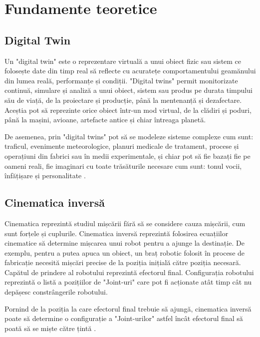 
\clearpage




\section{Fundamente teoretice}
\subsection{Digital Twin}
Un "digital twin" este o reprezentare virtuală a unui obiect fizic sau sistem ce folosește date din timp real să reflecte cu acuratețe comportamentului geamănului din lumea reală, performanțe și condiții.
"Digital twins" permit monitorizate continuă, simulare și analiză a unui obiect, sistem sau produs pe durata timpului său de viață, de la proiectare și producție, până la mentenanță și dezafectare.
Aceștia pot  să reprezinte orice obiect într-un mod virtual, de la clădiri și poduri, până la mașini, avioane, artefacte antice și chiar întreaga planetă\cite{DigTwinIBM}. 

De asemenea, prin "digital twins"  pot să se modeleze sisteme complexe cum sunt: traficul, evenimente meteorologice, planuri medicale de tratament, procese și operațiuni din fabrici sau în medii experimentale, și chiar pot să fie bazați fie pe oameni reali, fie imaginari cu toate trăsăturile necesare cum sunt: tonul vocii, înfățișare și personalitate \cite{DigTwinIBM}. 


\subsection{Cinematica inversă}
Cinematica reprezintă studiul mișcării fără să se considere cauza mișcării, cum sunt forțele și cuplurile. Cinematica inversă reprezintă folosirea ecuațiilor cinematice să determine mișcarea unui robot pentru a ajunge la destinație. De exemplu, pentru a putea apuca un obiect, un braț robotic folosit în procese de fabricație necesită mișcări precise de la poziția inițială către poziția necesară. Capătul de prindere al robotului reprezintă efectorul final. Configurația robotului reprezintă o listă a pozițiilor de "Joint-uri" care pot fi acționate atât timp cât nu depășesc constrângerile robotului.

 Pornind de la poziția la care efectorul final trebuie să ajungă, cinematica inversă poate să determine o configurație a  "Joint-urilor" astfel încât efectorul final să poată să se miște către țintă \cite{IK}.

